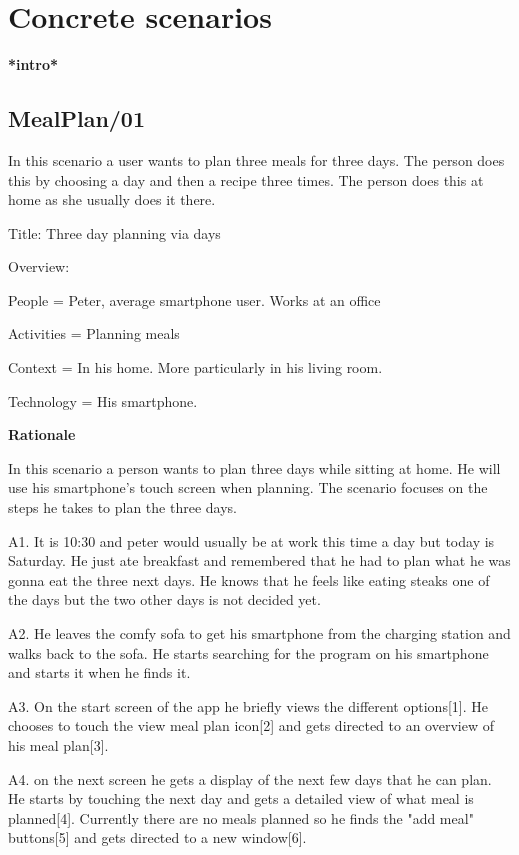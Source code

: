 \section{Concrete scenarios}
\textbf{*intro*}

\subsection{MealPlan/01} \label{MealPlan01}

In this scenario a user wants to plan three meals for three days. The person does this by choosing a day and then a recipe three times. The person does this at home as she usually does it there.

Title: Three day planning via days

Overview: 

	People = Peter, average smartphone user. Works at an office
	
	Activities = Planning meals
	
	Context = In his home. More particularly in his living room.
	
	Technology = His smartphone.
	
\textbf{Rationale}

In this scenario a person wants to plan three days while sitting at home. He will use his smartphone's touch screen when planning. The scenario focuses on the steps he takes to plan the three days.
	
	A1. It is 10:30 and peter would usually be at work this time a day but today is Saturday. He just ate breakfast and remembered that he had to plan what he was gonna eat the three next days. He knows that he feels like eating steaks one of the days but the two other days is not decided yet.
	
	A2. He leaves the comfy sofa to get his smartphone from the charging station and walks back to the sofa. He starts searching for the program on his smartphone and starts it when he finds it.
	
	A3. On the start screen of the app he briefly views the different options[1]. He chooses to touch the view meal plan icon[2] and gets directed to an overview of his meal plan[3]. 
	
	A4. on the next screen he gets a display of the next few days that he can plan. He starts by touching the next day and gets a detailed view of what meal is planned[4]. Currently there are no meals planned so he finds the "add meal" buttons[5] and gets directed to a new window[6]. 
	
